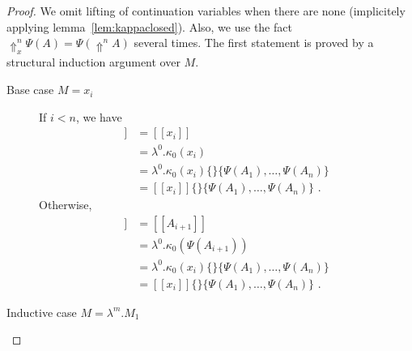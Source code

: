 \documentclass[a4paper,11pt,draft]{article}
\begin{document}
\begin{proof}
We omit lifting of continuation variables when there are none (implicitely applying
lemma~\ref{lem:kappaclosed}). Also, we use the fact $\Uparrow_{x}^{n} \Psi(A) = \Psi(\Uparrow^{n} A)$
several times. The first statement is proved by a structural induction argument over $M$.

\begin{description}
\item[\sffamily Base case $M = x_{i}$]\hfill

  If $i < n$, we have
  \begin{align*}
    [\![x_{i}\{A_{1}, \ldots, A_{n}\}]\!] &= [\![x_{i}]\!] \\
                                        &= \lambda^{0}.\kappa_{0}(x_{i}) \\
                                        &= \lambda^{0}.\kappa_{0}(x_{i})\{\}\{\Psi(A_{1}), \ldots, \Psi(A_{n})\} \\
                                        &= [\![x_{i}]\!]\{\}\{\Psi(A_{1}), \ldots, \Psi(A_{n})\} \text{ .}
  \end{align*}
  Otherwise,
  \begin{align*}
    [\![x_{i}\{A_{1}, \ldots, A_{n}\}]\!] &= [\![A_{i+1}]\!] \\
                                        &= \lambda^{0}.\kappa_{0}(\Psi(A_{i+1})) \\
                                        &= \lambda^{0}.\kappa_{0}(x_{i})\{\}\{\Psi(A_{1}), \ldots, \Psi(A_{n})\} \\
                                        &= [\![x_{i}]\!]\{\}\{\Psi(A_{1}), \ldots, \Psi(A_{n})\} \text{ .}
  \end{align*}

\item[\sffamily Inductive case $M = \lambda^{m}.M_{1}$]\hfill


\end{description}
\end{proof}
\end{document}
